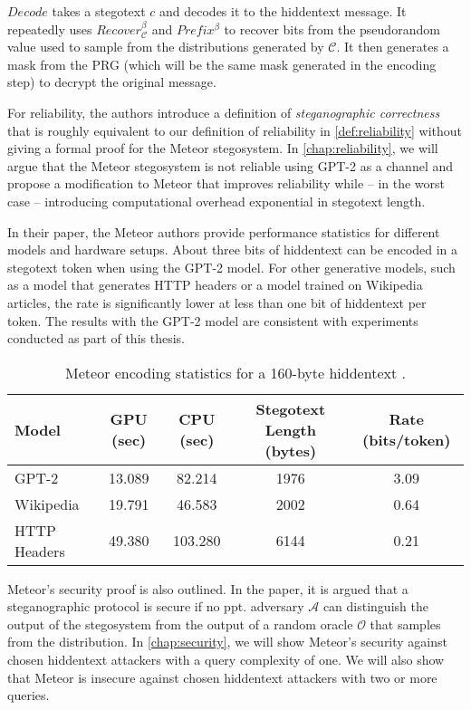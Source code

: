 $Decode$ takes a stegotext $c$ and decodes it to the hiddentext message.
It repeatedly uses $Recover_{\mathcal{C}}^\beta$ and $Prefix^\beta$ to recover bits from the pseudorandom value used to sample from the distributions generated by $\mathcal{C}$.
It then generates a mask from the PRG (which will be the same mask generated in the encoding step) to decrypt the original message.

For reliability, the authors introduce a definition of \emph{steganographic correctness} that is roughly equivalent to our definition of reliability in \autoref{def:reliability} without giving a formal proof for the Meteor stegosystem.
In \autoref{chap:reliability}, we will argue that the Meteor stegosystem is not reliable using GPT-2 as a channel and propose a modification to Meteor that improves reliability while -- in the worst case -- introducing computational overhead exponential in stegotext length.

In their paper, the Meteor authors provide performance statistics for different models and hardware setups.
About three bits of hiddentext can be encoded in a stegotext token when using the GPT-2 model.
For other generative models, such as a model that generates HTTP headers or a model trained on Wikipedia articles, the rate is significantly lower at less than one bit of hiddentext per token.
The results with the GPT-2 model are consistent with experiments conducted as part of this thesis.

\begin{table}[h!]
  \begin{tabular}{l||c|c|c|c}
    Model & GPU (sec) & CPU (sec) & Stegotext Length (bytes) & Rate (bits/token) \\
    \hline
    GPT-2        & 13.089 & 82.214  & 1976 & 3.09 \\
    Wikipedia    & 19.791 & 46.583  & 2002 & 0.64 \\
    HTTP Headers & 49.380 & 103.280 & 6144 & 0.21 \\
  \end{tabular}
  \caption{Meteor encoding statistics for a 160-byte hiddentext \cite{Meteor2021}.}
\end{table}

Meteor's security proof is also outlined.
In the paper, it is argued that a steganographic protocol is secure if no ppt. adversary $\mathcal{A}$ can distinguish the output of the stegosystem from the output of a random oracle $\mathcal{O}$ that samples from the distribution.
In \autoref{chap:security}, we will show Meteor's security against chosen hiddentext attackers with a query complexity of one.
We will also show that Meteor is insecure against chosen hiddentext attackers with two or more queries.
